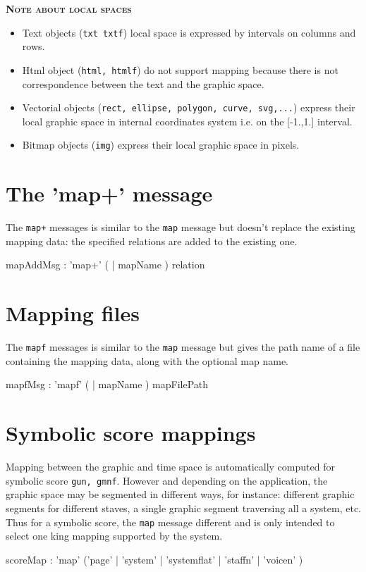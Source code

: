 \documentclass[a4paper,twoside]{report}
\newcommand{\sublevel}[1]	{\section{#1}}
\newcommand{\OSC}[1]		{\texttt{#1}}
\newcommand{\note}	[1]		{\vspace{2mm}\textbf{\hspace{-1.03cm}\textbf{\textsc{Note #1}}}}
\begin{document}
\note{about local spaces}
\begin{itemize}
\item Text objects (\OSC{txt txtf}) local space is expressed by intervals on columns and rows.
\item Html object (\OSC{html, htmlf}) do not support mapping because there is not correspondence between the text and the graphic space.
\item Vectorial objects (\OSC{rect, ellipse, polygon, curve, svg,...}) express their local graphic space in internal coordinates system i.e. on the [-1.,1.] interval.
\item Bitmap objects (\OSC{img}) express their local graphic space in pixels.
\end{itemize}


\sublevel{The 'map+' message}
\label{mapAddMsg}
The \OSC{map+} messages is similar to the \OSC{map} message but doesn't replace the existing mapping data: the specified relations are added to the existing one.

\begin{rail}
mapAddMsg : 'map+' ( | mapName ) relation
\end{rail}


\sublevel{Mapping files}
\label{mapFileMsg}
The \OSC{mapf} messages is similar to the \OSC{map} message but gives the path name of a file containing the mapping data, along with the optional map name.
\begin{rail}
mapfMsg : 'mapf' ( | mapName ) mapFilePath
\end{rail}



\sublevel{Symbolic score mappings}
\label{guidomap}

Mapping between the graphic and time space is automatically computed for symbolic score \OSC{gun, gmnf}. However and depending on the application, the graphic space may be segmented in different ways, for instance: different graphic segments for different staves, a single graphic segment traversing all a system, etc. Thus for a symbolic score, the \OSC{map} message different and is only intended to select one king mapping supported by the system.

\begin{rail}
scoreMap : 'map' ('page' | 'system' | 'systemflat' | 'staffn' | 'voicen' )
\end{rail}
\end{document}
